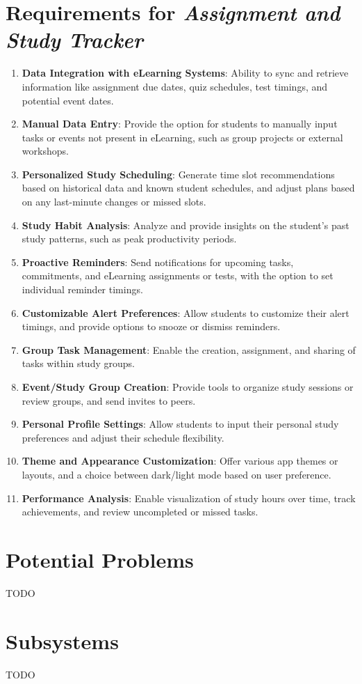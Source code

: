 \documentclass[12pt]{article}
\newcommand\projectname{\textit{Assignment and Study Tracker\ }}
\begin{document}
\section{Requirements for \projectname}
    \begin{enumerate}
        \item \textbf{Data Integration with eLearning Systems}: Ability to sync and retrieve information like assignment due dates, quiz schedules, test timings, and potential event dates.
        \item \textbf{Manual Data Entry}: Provide the option for students to manually input tasks or events not present in eLearning, such as group projects or external workshops.
        \item \textbf{Personalized Study Scheduling}: Generate time slot recommendations based on historical data and known student schedules, and adjust plans based on any last-minute changes or missed slots.
        \item \textbf{Study Habit Analysis}: Analyze and provide insights on the student's past study patterns, such as peak productivity periods.
        \item \textbf{Proactive Reminders}: Send notifications for upcoming tasks, commitments, and eLearning assignments or tests, with the option to set individual reminder timings.
        \item \textbf{Customizable Alert Preferences}: Allow students to customize their alert timings, and provide options to snooze or dismiss reminders.
        \item \textbf{Group Task Management}: Enable the creation, assignment, and sharing of tasks within study groups.
        \item \textbf{Event/Study Group Creation}: Provide tools to organize study sessions or review groups, and send invites to peers.
        \item \textbf{Personal Profile Settings}: Allow students to input their personal study preferences and adjust their schedule flexibility.
        \item \textbf{Theme and Appearance Customization}: Offer various app themes or layouts, and a choice between dark/light mode based on user preference.
        \item \textbf{Performance Analysis}: Enable visualization of study hours over time, track achievements, and review uncompleted or missed tasks.
    \end{enumerate}

\section{Potential Problems}
TODO

\section{Subsystems}
TODO
\end{document}
